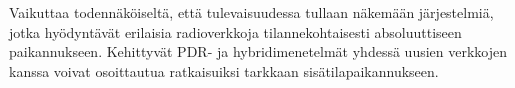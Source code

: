 Vaikuttaa todennäköiseltä, että tulevaisuudessa tullaan näkemään järjestelmiä,
jotka hyödyntävät erilaisia radioverkkoja tilannekohtaisesti absoluuttiseen
paikannukseen. Kehittyvät PDR- ja hybridimenetelmät yhdessä uusien verkkojen
kanssa voivat osoittautua ratkaisuiksi tarkkaan sisätilapaikannukseen.
